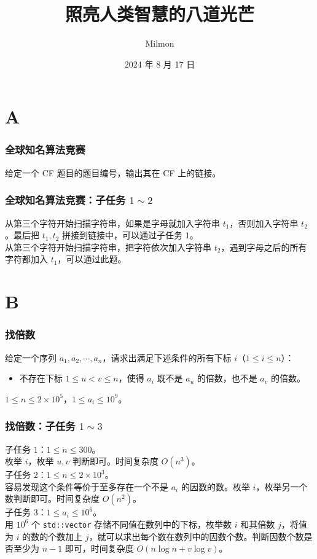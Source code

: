 \documentclass{beamer}
\title[照亮人类智慧的八道光芒]{照亮人类智慧的八道光芒}
\author{Milmon}
\institute[Hailiang Junior High School]
{
Hailiang Junior High School
}
\date{2024 年 8 月 17 日}
\begin{document}
\begin{frame}
\titlepage
\end{frame}

\section{A}

\begin{frame}
\frametitle{全球知名算法竞赛}
给定一个 CF 题目的题目编号，输出其在 CF 上的链接。
\end{frame}

\begin{frame}
\frametitle{全球知名算法竞赛：子任务 $1 \sim 2$}
从第三个字符开始扫描字符串，如果是字母就加入字符串 $t_1$，否则加入字符串 $t_2$。最后把 $t_1,t_2$ 拼接到链接中，可以通过子任务 $1$。\\
\pause
从第三个字符开始扫描字符串，把字符依次加入字符串 $t_2$，遇到字母之后的所有字符都加入 $t_1$，可以通过此题。
\end{frame}

\section{B}

\begin{frame}
\frametitle{找倍数}
给定一个序列 $a_1, a_2, \cdots, a_n$，请求出满足下述条件的所有下标 $i$（$1 \leq i \leq n$）：
\begin{itemize}
\item 不存在下标 $1 \leq u < v \leq n$，使得 $a_i$ 既不是 $a_u$ 的倍数，也不是 $a_v$ 的倍数。
\end{itemize}
$1 \leq n \leq 2 \times 10^5$，$1 \leq a_i \leq 10^9$。
\end{frame}

\begin{frame}
\frametitle{找倍数：子任务 $1 \sim 3$}
子任务 $1$：$1 \leq n \leq 300$。 \\
\pause
枚举 $i$，枚举 $u,v$ 判断即可。时间复杂度 $O(n^3)$。\\
\pause
子任务 $2$：$1 \leq n \leq 2 \times 10^3$。 \\
\pause
容易发现这个条件等价于至多存在一个不是 $a_i$ 的因数的数。枚举 $i$，枚举另一个数判断即可。时间复杂度 $O(n^2)$。 \\
\pause
子任务 $3$：$1 \leq a_i \leq 10^6$。\\
\pause
用 $10^6$ 个 \texttt{std::vector} 存储不同值在数列中的下标，枚举数 $i$ 和其倍数 $j$，将值为 $i$ 的数的个数加上 $j$，就可以求出每个数在数列中的因数个数。判断因数个数是否至少为 $n-1$ 即可，时间复杂度 $O(n \log n + v \log v)$。
\end{frame}
\end{document}
